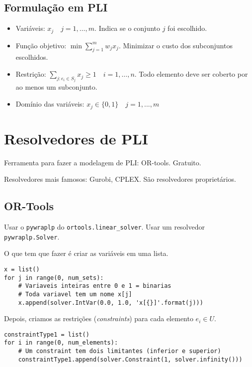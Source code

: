 \subsection{Formulação em PLI}

\begin{itemize}
    \item Variáveis: $x_j \quad j=1,\dots,m$. Indica se o conjunto $j$ foi escolhido.
    \item Função objetivo: $\min\sum_{j=1}^mw_jx_j$. Minimizar o custo dos subconjuntos escolhidos.
    \item Restrição: $\sum_{j:e_i \in S_j}x_j\geq 1\quad i=1,\dots,n$. Todo elemento deve ser coberto por ao menos um subconjunto.
    \item Domínio das variáveis: $x_j \in \{0,1\} \quad j=1,...,m$
\end{itemize}

\section{Resolvedores de PLI}

Ferramenta para fazer a modelagem de PLI: OR-tools. Gratuito.

Resolvedores mais famosos: Gurobi, CPLEX. São resolvedores proprietários.

\subsection{OR-Tools}

Usar o \lstinline{pywraplp} do \lstinline{ortools.linear_solver}. Usar um resolvedor \lstinline{pywraplp.Solver}.

O que tem que fazer é criar as variáveis em uma lista.

\begin{lstlisting}
x = list()
for j in range(0, num_sets):
    # Variaveis inteiras entre 0 e 1 = binarias
    # Toda variavel tem um nome x[j]
    x.append(solver.IntVar(0.0, 1.0, 'x[{}]'.format(j)))
\end{lstlisting}

Depois, criamos as restrições (\textit{constraints}) para cada elemento $e_i \in U$.

\begin{lstlisting}
constraintType1 = list()
for i in range(0, num_elements):
    # Um constraint tem dois limitantes (inferior e superior)
    constraintType1.append(solver.Constraint(1, solver.infinity()))
\end{lstlisting}

